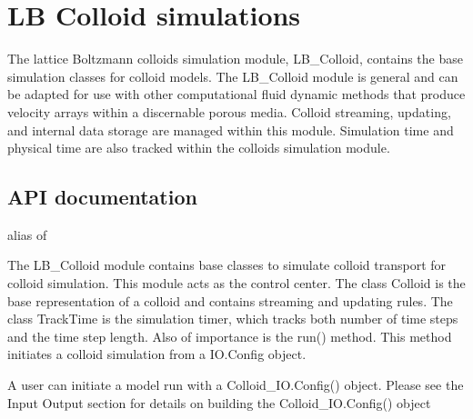 \documentclass[letterpaper,10pt,english]{sphinxmanual}
\begin{document}
\section{LB Colloid simulations}
\label{\detokenize{index:lb-colloid-simulations}}
The lattice Boltzmann colloids simulation module, LB\_Colloid, contains the base simulation classes for colloid models. The LB\_Colloid module is general and can be adapted for use with other computational fluid dynamic methods that produce velocity arrays within a discernable porous media. Colloid streaming, updating, and internal data storage are managed within this module. Simulation time and physical time are also tracked within the colloids simulation module.


\subsection{API documentation}
\label{\detokenize{index:id7}}\label{\detokenize{index:module-lb_colloids}}

\begin{fulllineitems}
\label{\detokenize{index:lb_colloids.ColloidModel}}
alias of {\hyperref[\detokenize{index:module-lb_colloids.Colloids.LB_Colloid}]{}}

\end{fulllineitems}

\label{\detokenize{index:module-lb_colloids.Colloids.LB_Colloid}}
The LB\_Colloid module contains base classes to simulate colloid transport for
colloid simulation. This module acts as the control center. The class Colloid
is the base representation of a colloid and contains
streaming and updating rules. The class TrackTime is the simulation timer, which tracks
both number of time steps and the time step length. Also of importance is the run()
method. This method initiates a colloid simulation from a IO.Config object.

A user can initiate a model run with a Colloid\_IO.Config() object.
Please see the Input Output section for details on building the Colloid\_IO.Config() object

\begin{sphinxVerbatim}[commandchars=\\\{\}]
   
    
\end{sphinxVerbatim}
\end{document}
